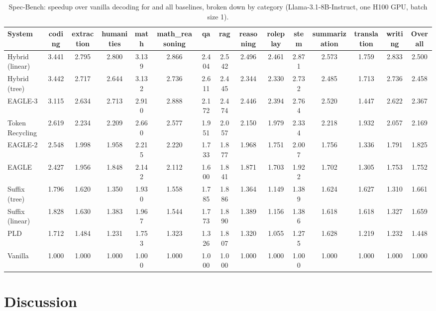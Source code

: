 \begin{table}[htbp]
\centering
\caption{Spec-Bench: speedup over vanilla decoding for \SuffixDecoding and all baselines, broken down by category (Llama-3.1-8B-Instruct, one H100 GPU, batch size 1).}
\label{suffixdecoding:tab:spec-speedup}
\small
\begin{adjustbox}{width=\linewidth}
\begin{tabular}{lcccccccccccccc}
\toprule
\textbf{System} & coding & extraction & humanities & math & math\_reasoning & qa & rag & reasoning & roleplay & stem & summarization & translation & writing & \textbf{Overall} \\
\midrule
Hybrid (linear) & 3.441 & 2.795 & 2.800 & 3.139 & 2.866 & 2.404 & 2.542 & 2.496 & 2.461 & 2.871 & 2.573 & 1.759 & 2.833 & 2.500 \\
Hybrid (tree) & 3.442 & 2.717 & 2.644 & 3.132 & 2.736 & 2.611 & 2.445 & 2.344 & 2.330 & 2.732 & 2.485 & 1.713 & 2.736 & 2.458 \\
EAGLE-3 & 3.115 & 2.634 & 2.713 & 2.910 & 2.888 & 2.172 & 2.474 & 2.446 & 2.394 & 2.764 & 2.520 & 1.447 & 2.622 & 2.367 \\
Token Recycling & 2.619 & 2.234 & 2.209 & 2.660 & 2.577 & 1.951 & 2.057 & 2.150 & 1.979 & 2.334 & 2.218 & 1.932 & 2.057 & 2.169 \\
EAGLE-2 & 2.548 & 1.998 & 1.958 & 2.215 & 2.220 & 1.733 & 1.877 & 1.968 & 1.751 & 2.007 & 1.756 & 1.336 & 1.791 & 1.825 \\
EAGLE & 2.427 & 1.956 & 1.848 & 2.142 & 2.112 & 1.600 & 1.841 & 1.871 & 1.703 & 1.922 & 1.702 & 1.305 & 1.753 & 1.752 \\
Suffix (tree) & 1.796 & 1.620 & 1.350 & 1.930 & 1.558 & 1.785 & 1.886 & 1.364 & 1.149 & 1.389 & 1.624 & 1.627 & 1.310 & 1.661 \\
Suffix (linear) & 1.828 & 1.630 & 1.383 & 1.967 & 1.544 & 1.773 & 1.890 & 1.389 & 1.156 & 1.386 & 1.618 & 1.618 & 1.327 & 1.659 \\
PLD & 1.712 & 1.484 & 1.231 & 1.753 & 1.323 & 1.326 & 1.807 & 1.320 & 1.055 & 1.275 & 1.628 & 1.219 & 1.232 & 1.448 \\
Vanilla & 1.000 & 1.000 & 1.000 & 1.000 & 1.000 & 1.000 & 1.000 & 1.000 & 1.000 & 1.000 & 1.000 & 1.000 & 1.000 & 1.000 \\
\bottomrule
\end{tabular}
\end{adjustbox}
\end{table}


\section{Discussion}
\label{suffixdecoding:sec:discussion}

